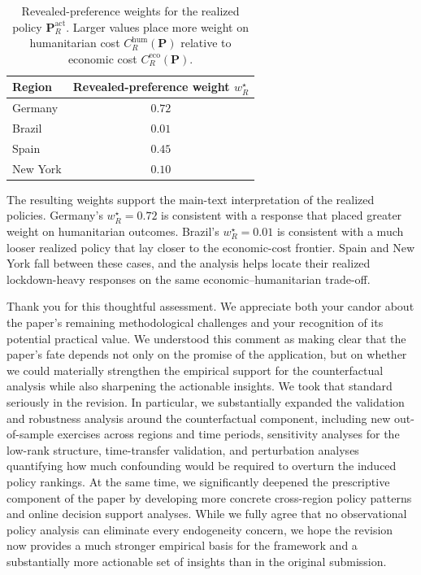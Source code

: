\documentclass[letterpaper,twoside,11pt]{reviewresponse}
\begin{document}
\begin{table}[h!]
\centering
\small
\begin{tabular}{|l|c|}
\hline
\textbf{Region} & \textbf{Revealed-preference weight $w_R^\star$} \\\hline
Germany  & $0.72$ \\
Brazil   & $0.01$ \\
Spain    & $0.45$ \\
New York & $0.10$ \\\hline
\end{tabular}
\caption{Revealed-preference weights for the realized policy $\bm{P}_R^{\mathrm{act}}$. Larger values place more weight on humanitarian cost $C_R^{\mathrm{hum}}(\bm{P})$ relative to economic cost $C_R^{\mathrm{eco}}(\bm{P})$.}
\label{tab:revealed_preference_weights}
\end{table}

The resulting weights support the main-text interpretation of the realized policies. Germany's $w_R^\star=0.72$ is consistent with a response that placed greater weight on humanitarian outcomes. Brazil's $w_R^\star=0.01$ is consistent with a much looser realized policy that lay closer to the economic-cost frontier. Spain and New York fall between these cases, and the analysis helps locate their realized lockdown-heavy responses on the same economic--humanitarian trade-off. 


Thank you for this thoughtful assessment. We appreciate both your candor about the paper’s remaining methodological challenges and your recognition of its potential practical value. We understood this comment as making clear that the paper’s fate depends not only on the promise of the application, but on whether we could materially strengthen the empirical support for the counterfactual analysis while also sharpening the actionable insights. We took that standard seriously in the revision. In particular, we substantially expanded the validation and robustness analysis around the counterfactual component, including new out-of-sample exercises across regions and time periods, sensitivity analyses for the low-rank structure, time-transfer validation, and perturbation analyses quantifying how much confounding would be required to overturn the induced policy rankings. At the same time, we significantly deepened the prescriptive component of the paper by developing more concrete cross-region policy patterns and online decision support analyses. While we fully agree that no observational policy analysis can eliminate every endogeneity concern, we hope the revision now provides a much stronger empirical basis for the framework and a substantially more actionable set of insights than in the original submission.
\end{document}
